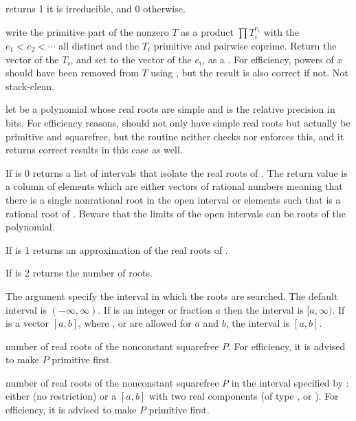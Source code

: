  returns 1 it  is irreducible, and
0 otherwise.

 write the primitive part of the
nonzero  $T$ as a product $\prod T_i^{e_i}$ with the $e_1 < e_2 <
\cdots$ all distinct and the $T_i$ primitive and pairwise coprime. Return the
vector of the $T_i$, and set  to the vector of the $e_i$, as a
. For efficiency, powers of $x$ should have been removed from
$T$ using , but the result is also correct if not. Not
stack-clean.

 let  be a
 polynomial whose real roots are simple and  is the
relative precision in bits. For efficiency reasons,  should not only
have simple real roots but actually be primitive and squarefree, but the
routine neither checks nor enforces this, and it returns correct results in
this case as well.

\item If  is 0 returns a list of intervals that isolate the real
roots of . The return value is a column of elements which are either
vectors \kbd{[a,b]} of rational numbers meaning that there is a single
nonrational root in the open interval  or elements  such
that  is a rational root of . Beware that the limits of the
open intervals can be roots of the polynomial.

\item If  is 1 returns an approximation of the real roots of .

\item If  is 2 returns the number of roots.

The argument  specify the interval in which the roots
are searched. The default interval is $(-\infty,\infty)$. If  is an
integer or fraction $a$ then the interval is $[a,\infty)$. If  is
a vector $[a,b]$, where ,  or  are allowed
for $a$ and $b$, the interval is $[a,b]$.

 number of real roots of the nonconstant
squarefree  $P$. For efficiency, it is advised to make $P$ primitive
first.

 number of real roots of the
nonconstant squarefree  $P$ in the interval specified by :
either  (no restriction) or a  $[a,b]$ with two real
components (of type ,  or ). For efficiency,
it is advised to make $P$ primitive first.

